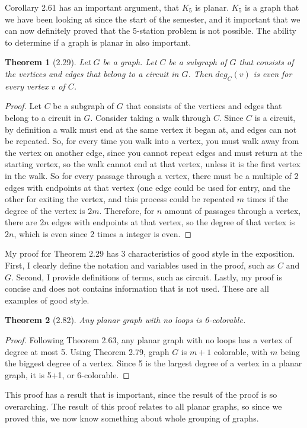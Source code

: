 \documentclass{article}
\newtheorem*{thm}{Theorem}
\begin{document}
\begin{description}
		Corollary 2.61 has an important argument, that $K_5$ is planar. $K_5$ is a graph that we have been looking at since the
		start of the semester, and it important that we can now definitely proved that the 5-station problem is not possible. The ability
		to determine if a graph is planar in also important. 

		\begin{thm}[2.29]
		  	Let $G$ be a graph. Let $C$ be a subgraph of $G$ that consists of the vertices and edges that belong to a circuit in $G$. Then $deg_C(v)$ is 
			even for every vertex $v$ of $C$.
	       \end{thm}
	       \begin{proof}
			 Let $C$ be a subgraph of $G$ that consists of the vertices and edges that belong to a circuit in $G$.
			 Consider taking a walk through $C$. Since $C$ is a circuit, by definition a walk must end at the same vertex it began at, and
			 edges can not be repeated. So, for every time you walk into a vertex, 
		 	 you must walk away from the vertex on another edge, since you cannot repeat edges and must return at the starting vertex, so
			 the walk cannot end at that vertex, unless it is the first vertex in the walk. 
			 So for every passage through a vertex, there  must be a multiple of  
			 2 edges with endpoints at that vertex (one edge could be used for entry, and the other for exiting the vertex, and 
			 this process could be repeated $m$ times if the degree of the vertex is $2m$.
			 Therefore, for $n$ amount of passages through a vertex, 
			 there are $2n$ edges with endpoints at that vertex, so the degree of that vertex is $2n$, which is even since 2 times a 
			 integer is even.
		\end{proof}
						       
		My proof for Theorem 2.29 has 3 characteristics of good style in the exposition. First, I clearly define the notation and variables
		used in the proof, such as $C$ and $G$. Second, I provide definitions of terms, such as circuit. Lastly, my proof is concise and
		does not contains information that is not used. These are all examples of good style. 


\begin{thm}[2.82]
	  	Any planar graph with no loops is 6-colorable.
	      \end{thm}
	      \begin{proof}
			Following Theorem 2.63, any planar graph with no loops has a vertex of degree at most 5. Using Theorem 2.79,  graph $G$ is $m+1$ colorable, with $m$ being the biggest degree of a vertex.
			Since 5 is the largest degree of a vertex in a planar graph, it is 5+1, or 6-colorable.
	      \end{proof}
			This proof has a result that is important, since the result of the proof is so overarching. The result of this proof
			relates to all planar graphs, so since we proved this, we now know something about whole grouping of graphs.


\end{description}
\end{document}
